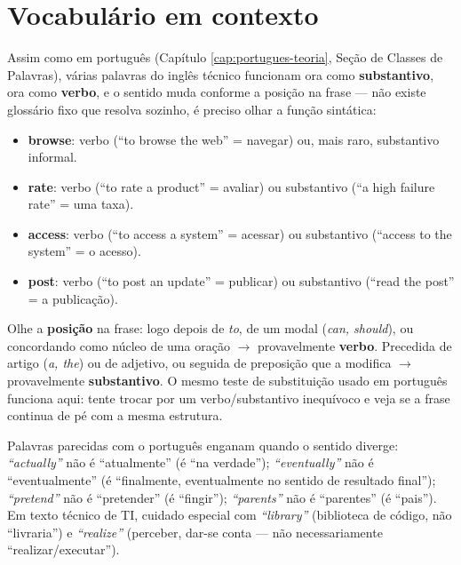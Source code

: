 \section{Vocabulário em contexto}

\begin{conceito}
Assim como em português (Capítulo \ref{cap:portugues-teoria}, Seção de
Classes de Palavras), várias palavras do inglês técnico funcionam ora como
\textbf{substantivo}, ora como \textbf{verbo}, e o sentido muda conforme a
posição na frase --- não existe glossário fixo que resolva sozinho, é
preciso olhar a função sintática:

\begin{itemize}
\item \textbf{browse}: verbo (“to browse the web” = navegar) ou, mais raro,
substantivo informal.
\item \textbf{rate}: verbo (“to rate a product” = avaliar) ou substantivo
(“a high failure rate” = uma taxa).
\item \textbf{access}: verbo (“to access a system” = acessar) ou
substantivo (“access to the system” = o acesso).
\item \textbf{post}: verbo (“to post an update” = publicar) ou substantivo
(“read the post” = a publicação).
\end{itemize}
\end{conceito}

\begin{regrapratica}
Olhe a \textbf{posição} na frase: logo depois de \textit{to}, de um modal
(\textit{can, should}), ou concordando como núcleo de uma oração $\to$
provavelmente \textbf{verbo}. Precedida de artigo (\textit{a, the}) ou de
adjetivo, ou seguida de preposição que a modifica $\to$ provavelmente
\textbf{substantivo}. O mesmo teste de substituição usado em português
funciona aqui: tente trocar por um verbo/substantivo inequívoco e veja se a
frase continua de pé com a mesma estrutura.
\end{regrapratica}

\begin{cuidado}
Palavras parecidas com o português enganam quando o sentido diverge:
\textit{“actually”} não é “atualmente” (é “na verdade”);
\textit{“eventually”} não é “eventualmente” (é “finalmente,
eventualmente no sentido de resultado final”); \textit{“pretend”} não é
“pretender” (é “fingir”); \textit{“parents”} não é “parentes” (é
“pais”). Em texto técnico de TI, cuidado especial com \textit{“library”}
(biblioteca de código, não “livraria”) e \textit{“realize”} (perceber, dar-se
conta --- não necessariamente “realizar/executar”).
\end{cuidado}

